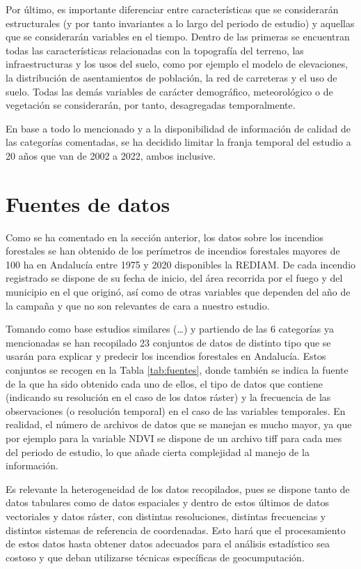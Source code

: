 \documentclass[12pt,a4paper,]{book}
\numberwithin{dummy}{section}
\theoremstyle{ocrenumbox}
\theoremstyle{blacknumex}
\theoremstyle{blacknumbox}
\theoremstyle{ocrenum}
\theoremstyle{ocrenum}
\begin{document}
Por último, es importante diferenciar entre características que se
considerarán estructurales (y por tanto invariantes a lo largo del
periodo de estudio) y aquellas que se considerarán variables en el
tiempo. Dentro de las primeras se encuentran todas las características
relacionadas con la topografía del terreno, las infraestructuras y los
usos del suelo, como por ejemplo el modelo de elevaciones, la
distribución de asentamientos de población, la red de carreteras y el
uso de suelo. Todas las demás variables de carácter demográfico,
meteorológico o de vegetación se considerarán, por tanto, desagregadas
temporalmente.

En base a todo lo mencionado y a la disponibilidad de información de
calidad de las categorías comentadas, se ha decidido limitar la franja
temporal del estudio a 20 años que van de 2002 a 2022, ambos inclusive.

\hypertarget{fuentes-de-datos}{%
\section{Fuentes de datos}\label{fuentes-de-datos}}

Como se ha comentado en la sección anterior, los datos sobre los
incendios forestales se han obtenido de los perímetros de incendios
forestales mayores de 100 ha en Andalucía entre 1975 y 2020 disponibles
la REDIAM. De cada incendio registrado se dispone de su fecha de inicio,
del área recorrida por el fuego y del municipio en el que originó, así
como de otras variables que dependen del año de la campaña y que no son
relevantes de cara a nuestro estudio.

Tomando como base estudios similares (\ldots) y partiendo de las 6
categorías ya mencionadas se han recopilado 23 conjuntos de datos de
distinto tipo que se usarán para explicar y predecir los incendios
forestales en Andalucía. Estos conjuntos se recogen en la Tabla
\ref{tab:fuentes}, donde también se indica la fuente de la que ha sido
obtenido cada uno de ellos, el tipo de datos que contiene (indicando su
resolución en el caso de los datos ráster) y la frecuencia de las
observaciones (o resolución temporal) en el caso de las variables
temporales. En realidad, el número de archivos de datos que se manejan
es mucho mayor, ya que por ejemplo para la variable NDVI se dispone de
un archivo tiff para cada mes del periodo de estudio, lo que añade
cierta complejidad al manejo de la información.

Es relevante la heterogeneidad de los datos recopilados, pues se dispone
tanto de datos tabulares como de datos espaciales y dentro de estos
últimos de datos vectoriales y datos ráster, con distintas resoluciones,
distintas frecuencias y distintos sistemas de referencia de coordenadas.
Esto hará que el procesamiento de estos datos hasta obtener datos
adecuados para el análisis estadístico sea costoso y que deban
utilizarse técnicas específicas de geocumputación.
\end{document}

